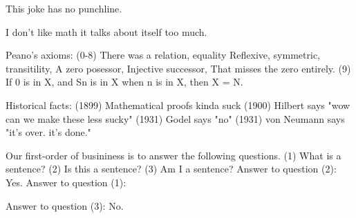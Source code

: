 This joke has no punchline.

I don't like math it talks about itself too much.

Peano's axioms:
(0-8) 	There was a relation, equality
		Reflexive, symmetric, transitility,
		A zero posessor,
		Injective successor,
		That misses the zero entirely.
(9)		If 0 is in X, and Sn is in X when n is in X, then X = N.

Historical facts:
(1899) Mathematical proofs kinda suck
(1900) Hilbert says "wow can we make these less sucky"
(1931) Godel says "no"
(1931) von Neumann says "it's over. it's done."

Our first-order of busininess is to answer the following questions.
(1) What is a sentence?
(2) Is this a sentence?
(3) Am I a sentence?
Answer to question (2):
Yes.
Answer to question (1):

Answer to question (3):
No.
